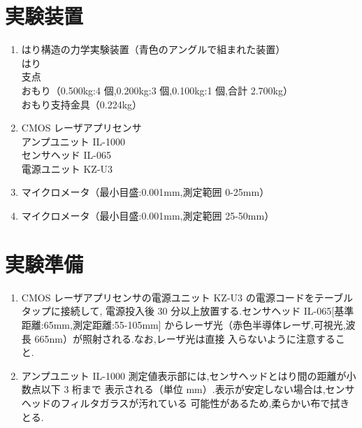\documentclass[a4paper,11pt]{jsarticle}
\begin{document}
\section{実験装置}
\begin{enumerate}
  \item はり構造の力学実験装置（青色のアングルで組まれた装置）\\
        はり\\
        支点\\
        おもり（0.500kg:4 個,0.200kg:3 個,0.100kg:1 個,合計 2.700kg）\\
        おもり支持金具（0.224kg）
  \item CMOS レーザアプリセンサ\\
        アンプユニット IL-1000\\
        センサヘッド IL-065\\
        電源ユニット KZ-U3
  \item マイクロメータ（最小目盛:0.001mm,測定範囲 0-25mm）
  \item マイクロメータ（最小目盛:0.001mm,測定範囲 25-50mm）
\end{enumerate}

\section{実験準備}
\begin{enumerate}
  \item CMOS レーザアプリセンサの電源ユニット KZ-U3 の電源コードをテーブルタップに接続して,
        電源投入後 30 分以上放置する.センサヘッド IL-065[基準距離:65mm,測定距離:55-105mm]
        からレーザ光（赤色半導体レーザ,可視光,波長 665nm）が照射される.なお,レーザ光は直接
        入らないように注意すること.
  \item アンプユニット IL-1000 測定値表示部には,センサヘッドとはり間の距離が小数点以下 3 桁まで
        表示される（単位 mm）.表示が安定しない場合は,センサヘッドのフィルタガラスが汚れている
        可能性があるため,柔らかい布で拭きとる.
\end{enumerate}
\end{document}
